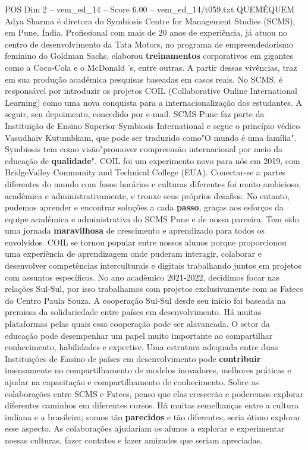 \begin{textsample}{POS Dim 2 – vem\_ed\_14 – Score 6.00 – vem\_ed\_14/t059.txt}  \label{ex:f2_pos_117}
QUEMÉQUEM Adya Sharma é diretora do Symbiosis Centre for Management Studies (SCMS), em Pune, Índia.
Profissional com mais de 20 anos de experiência, já atuou no centro de desenvolvimento da Tata Motors, no programa de empreendedorismo feminino do Goldman Sachs, elaborou \textbf{treinamentos} corporativos em gigantes como a Coca-Cola e o McDonald 's, entre outras.
A partir dessas vivências, traz em sua produção acadêmica pesquisas baseadas em casos reais.
No SCMS, é responsável por introduzir os projetos COIL (Collaborative Online International Learning) como uma nova conquista para a internacionalização dos estudantes.
A seguir, seu depoimento, concedido por e-mail.
SCMS Pune faz parte da Instituição de Ensino Superior Symbiosis International e segue o princípio védico Vasudhaiv Kutumbkam, que pode ser traduzido como"O mundo é uma família".
Symbiosis tem como visão"promover compreensão internacional por meio da educação de \textbf{qualidade}".
COIL foi um experimento novo para nós em 2019, com BridgeValley Community and Technical College (EUA).
Conectar-se a partes diferentes do mundo com fusos horários e culturas diferentes foi muito ambicioso, acadêmica e administrativamente, e trouxe seus próprios desafios.
No entanto, pudemos aprender e encontrar soluções a cada \textbf{passo}, graças aos esforços da equipe acadêmica e administrativa do SCMS Pune e de nossa parceira.
Tem sido uma jornada \textbf{maravilhosa} de crescimento e aprendizado para todos os envolvidos.
COIL se tornou popular entre nossos alunos porque proporcionou uma experiência de aprendizagem onde puderam interagir, colaborar e desenvolver competências interculturais e digitais trabalhando juntos em projetos com assuntos específicos.
No ano acadêmico 2021-2022, decidimos focar nas relações Sul-Sul, por isso trabalhamos com projetos exclusivamente com as Fatecs do Centro Paula Souza.
A cooperação Sul-Sul desde seu início foi baseada na premissa da solidariedade entre países em desenvolvimento.
Há muitas plataformas pelas quais essa cooperação pode ser alavancada.
O setor da educação pode desempenhar um papel muito importante ao compartilhar conhecimento, habilidades e expertise.
Uma estrutura adequada entre duas Instituições de Ensino de países em desenvolvimento pode \textbf{contribuir} imensamente no compartilhamento de modelos inovadores, melhores práticas e ajudar na capacitação e compartilhamento de conhecimento.
Sobre as colaborações entre SCMS e Fatecs, penso que elas crescerão e poderemos explorar diferentes caminhos em diferentes cursos.
Há muitas semelhanças entre a cultura indiana e a brasileira; somos tão \textbf{parecidos} e tão diferentes, seria ótimo explorar esse aspecto.
As colaborações ajudariam os alunos a explorar e experimentar nossas culturas, fazer contatos e fazer amizades que seriam apreciadas.

\end{textsample}
